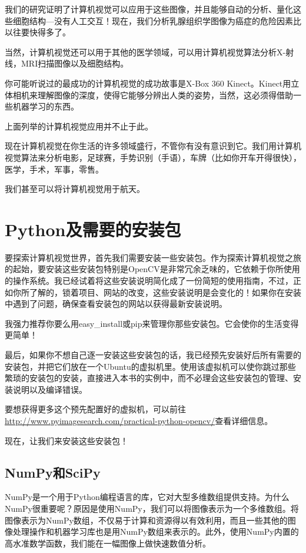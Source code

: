 \documentclass[color=green,mathpazo,titlestyle=hang]{elegantbook}
\begin{document}
我们的研究证明了计算机视觉可以应用于这些图像，并且能够自动的分析、量化这些细胞结构—没有人工交互！现在，我们分析乳腺组织学图像为癌症的危险因素比以往要快得多了。

当然，计算机视觉还可以用于其他的医学领域，可以用计算机视觉算法分析X-射线，MRI扫描图像以及细胞结构。

你可能听说过的最成功的计算机视觉的成功故事是X-Box 360 Kinect。Kinect用立体相机来理解图像的深度，使得它能够分辨出人类的姿势，当然，这必须得借助一些机器学习的东西。

上面列举的计算机视觉应用并不止于此。

现在计算机视觉在你生活的许多领域盛行，不管你有没有意识到它。我们用计算机视觉算法来分析电影，足球赛，手势识别（手语），车牌（比如你开车开得很快），医学，手术，军事，零售。

我们甚至可以将计算机视觉用于航天。

\chapter{Python及需要的安装包}

要探索计算机视觉世界，首先我们需要安装一些安装包。作为探索计算机视觉之旅的起始，要安装这些安装包特别是OpenCV是非常冗余乏味的，它依赖于你所使用的操作系统。我已经试着将这些安装说明简化成了一份简短的使用指南，不过，正如你所了解的，锁着项目、网站的改变，这些安装说明是会变化的！如果你在安装中遇到了问题，确保查看安装包的网站以获得最新安装说明。

我强力推荐你要么用easy\_install或pip来管理你那些安装包。它会使你的生活变得更简单！

最后，如果你不想自己逐一安装这些安装包的话，我已经预先安装好后所有需要的安装包，并把它们放在一个Ubuntu的虚拟机里。使用该虚拟机可以使你跳过那些繁琐的安装包的安装，直接进入本书的实例中，而不必理会这些安装包的管理、安装说明以及编译错误。

要想获得更多这个预先配置好的虚拟机，可以前往\url{http://www.pyimagesearch.com/practical-python-opencv/}查看详细信息。

现在，让我们来安装这些安装包！

\section{NumPy和SciPy}

NumPy是一个用于Python编程语言的库，它对大型多维数组提供支持。为什么NumPy很重要呢？原因是使用NumPy，我们可以将图像表示为一个多维数组。将图像表示为NumPy数组，不仅易于计算和资源得以有效利用，而且一些其他的图像处理操作和机器学习库也是用NumPy数组来表示的。此外，使用NumPy内置的高水准数学函数，我们能在一幅图像上做快速数值分析。
\end{document}
